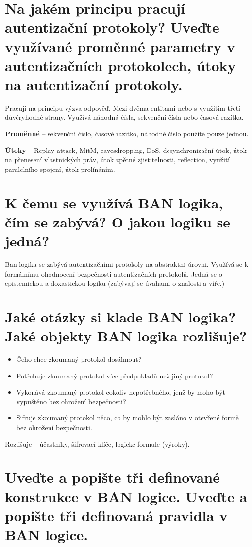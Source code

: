 \section{Na jakém principu pracují autentizační protokoly? Uveďte využívané proměnné parametry v autentizačních protokolech, útoky na autentizační protokoly.}

Pracují na principu výzva-odpověď. Mezi dvěma entitami nebo s využitím třetí důvěryhodné strany. Využívá náhodná čísla, sekvenční čísla nebo časová razítka.

\textbf{Proměnné} -- sekvenční číslo, časové razítko, náhodné číslo použité pouze jednou.

\textbf{Útoky} -- Replay attack, MitM, eavesdropping, DoS, desynchronizační útok, útok na přenesení vlastnických práv, útok zpětné zjistitelnosti, reflection, využití paralelního spojení, útok prolínáním.

\section{K čemu se využívá BAN logika, čím se zabývá? O jakou logiku se jedná?}

Ban logika se zabývá autentizačními protokoly na abstraktní úrovni. Využívá se k formálnímu ohodnocení bezpečnosti autentizačních protokolů. Jedná se o epistemickou a doxastickou logiku (zabývají se úvahami o znalosti a víře.) 

\section{Jaké otázky si klade BAN logika? Jaké objekty BAN logika rozlišuje?}

\begin{itemize}
    \item Čeho chce zkoumaný protokol dosáhnout?
    \item Potřebuje zkoumaný protokol více předpokladů než jiný protokol?
    \item Vykonává zkoumaný protokol cokoliv nepotřebného, jenž by moho být vypuštěno bez ohrožení bezpečnosti?
    \item Šifruje zkoumaný protokol něco, co by mohlo být zasláno v otevřené formě bez ohrožení bezpečnosti.
\end{itemize}

Rozlišuje -- účastníky, šifrovací klíče, logické formule (výroky).

\section{Uveďte a popište tři definované konstrukce v BAN logice. Uveďte a popište tři definovaná pravidla v BAN logice.}

